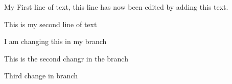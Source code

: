 \documentclass{article}
\begin{document}
My First line of text, this line has now been edited by adding this text.


This is my second line of text

I am changing this in my branch

This is the second changr in the branch

Third change in branch
\end{document}
